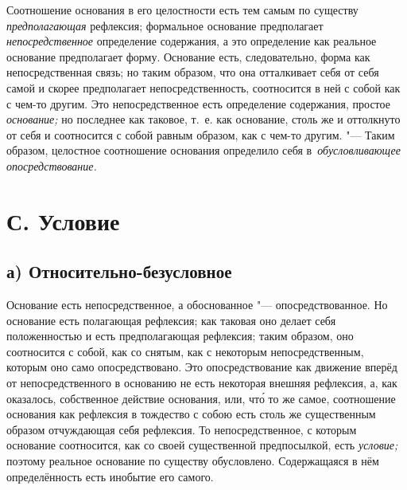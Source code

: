 Соотношение основания в его целостности есть тем самым по существу
{\em предполагающая} рефлексия; формальное основание
предполагает {\em непосредственное} определение
содержания, а это определение как реальное основание предполагает форму.
Основание есть, следовательно, форма как непосредственная связь; но таким
образом, что она отталкивает себя от себя самой и скорее предполагает
непосредственность, соотносится в ней с собой как с чем-то другим. Это
непосредственное есть определение содержания, простое
{\em основание;} но последнее как таковое, т.~е. как
основание, столь же и оттолкнуто от себя и соотносится с собой равным
образом, как с чем-то другим. "--- Таким образом, целостное соотношение
основания определило себя в~{\em обусловливающее опосредствование.}

\section[С. Условие]{С. Условие}

\subsection[а) Относительно-безусловное]{а) Относительно-безусловное}

Основание есть непосредственное, а обоснованное
"--- опосредствованное. Но основание есть полагающая рефлексия; как таковая
оно делает себя положенностью и есть предполагающая рефлексия; таким
образом, оно соотносится с собой, как со снятым, как с некоторым
непосредственным, которым оно само опосредствовано. Это опосредствование
как движение вперёд от непосредственного в основанию не есть некоторая
внешняя рефлексия, а, как оказалось, собственное действие основания, или,
чт\'{о} то же самое, соотношение основания как рефлексия в тождество с собою
есть столь же существенным образом отчуждающая себя рефлексия. То
непосредственное, с которым основание соотносится, как со своей
существенной предпосылкой, есть {\em условие;} поэтому
реальное основание по существу обусловлено. Содержащаяся в нём
определённость есть инобытие его самого.

